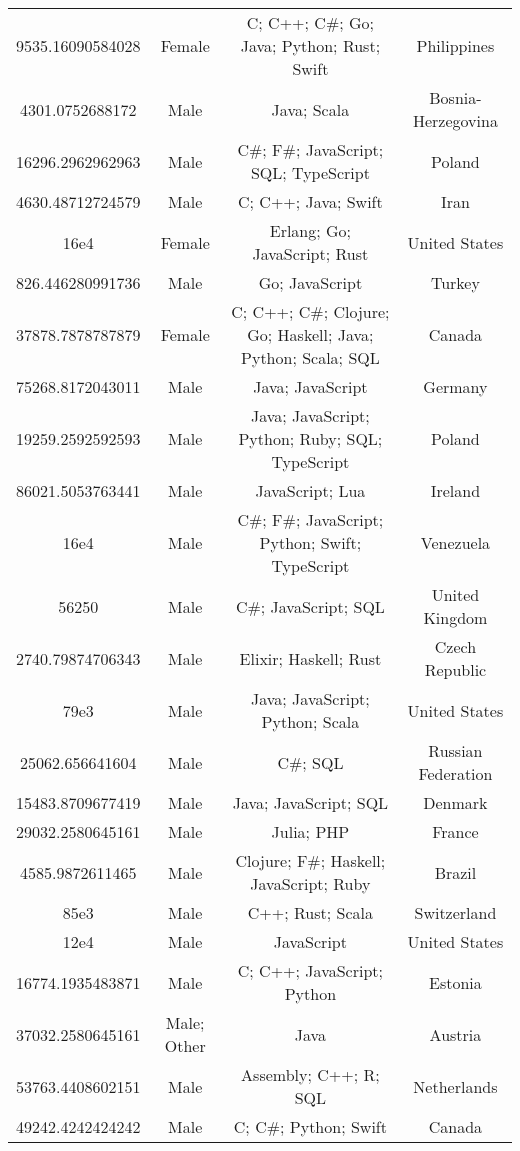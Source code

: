 \begin{center}
\begin{tabular}{ |c|c|c|c| }
9535.16090584028  &  Female  &  C; C++; C\#; Go; Java; Python; Rust; Swift  &  Philippines  \\ 
4301.0752688172  &  Male  &  Java; Scala  &  Bosnia-Herzegovina  \\ 
16296.2962962963  &  Male  &  C\#; F\#; JavaScript; SQL; TypeScript  &  Poland  \\ 
4630.48712724579  &  Male  &  C; C++; Java; Swift  &  Iran  \\ 
16e4  &  Female  &  Erlang; Go; JavaScript; Rust  &  United States  \\ 
826.446280991736  &  Male  &  Go; JavaScript  &  Turkey  \\ 
37878.7878787879  &  Female  &  C; C++; C\#; Clojure; Go; Haskell; Java; Python; Scala; SQL  &  Canada  \\ 
75268.8172043011  &  Male  &  Java; JavaScript  &  Germany  \\ 
19259.2592592593  &  Male  &  Java; JavaScript; Python; Ruby; SQL; TypeScript  &  Poland  \\ 
86021.5053763441  &  Male  &  JavaScript; Lua  &  Ireland  \\ 
16e4  &  Male  &  C\#; F\#; JavaScript; Python; Swift; TypeScript  &  Venezuela  \\ 
56250  &  Male  &  C\#; JavaScript; SQL  &  United Kingdom  \\ 
2740.79874706343  &  Male  &  Elixir; Haskell; Rust  &  Czech Republic  \\ 
79e3  &  Male  &  Java; JavaScript; Python; Scala  &  United States  \\ 
25062.656641604  &  Male  &  C\#; SQL  &  Russian Federation  \\ 
15483.8709677419  &  Male  &  Java; JavaScript; SQL  &  Denmark  \\ 
29032.2580645161  &  Male  &  Julia; PHP  &  France  \\ 
4585.9872611465  &  Male  &  Clojure; F\#; Haskell; JavaScript; Ruby  &  Brazil  \\ 
85e3  &  Male  &  C++; Rust; Scala  &  Switzerland  \\ 
12e4  &  Male  &  JavaScript  &  United States  \\ 
16774.1935483871  &  Male  &  C; C++; JavaScript; Python  &  Estonia  \\ 
37032.2580645161  &  Male; Other  &  Java  &  Austria  \\ 
53763.4408602151  &  Male  &  Assembly; C++; R; SQL  &  Netherlands  \\ 
49242.4242424242  &  Male  &  C; C\#; Python; Swift  &  Canada  \\ 

\end{tabular}
\end{center}
